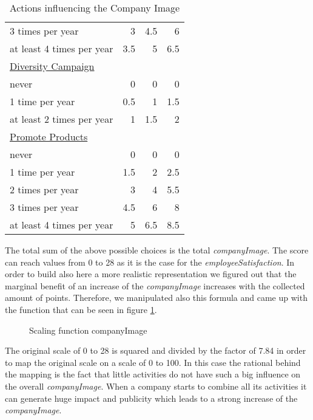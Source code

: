 \begin{table}[]
\begin{tabular}{|l|r|r|r|}
3 times per year                  & 3    & 4.5    & 6 \\
at least 4 times per year         & 3.5  & 5      & 6.5  \\
\underline{Diversity Campaign}    & & & \\
never                             & 0    & 0      & 0 \\
1 time per year                   & 0.5  & 1      & 1.5  \\
at least 2 times per year         & 1    & 1.5    & 2 \\
\underline{Promote Products} & & & \\
never                             & 0    & 0      & 0 \\
1 time per year                   & 1.5  & 2      & 2.5  \\
2 times per year                  & 3    & 4      & 5.5  \\
3 times per year                  & 4.5  & 6      & 8 \\
at least 4 times per year         & 5    & 6.5    & 8.5  \\
\hline
\end{tabular}
\caption{Actions influencing the Company Image}
\label{calculation_CI}
\end{table}

The total sum of the above possible choices is the total \textit{companyImage}. The score can reach values from 0 to 28 as it is the case for the \textit{employeeSatisfaction}. In order to build also here a more realistic representation we figured out that the marginal benefit of an increase of the \textit{companyImage} increases with the collected amount of points. Therefore, we manipulated also this formula and came up with the function that can be seen in figure \ref{fig:scaling}.

\begin{figure}
    \centering
    \caption{Scaling function companyImage}
    \label{fig:scaling}
\end{figure}

The original scale of 0 to 28 is squared and divided by the factor of 7.84 in order to map the original scale on a scale of 0 to 100. In this case the rational behind the mapping is the fact that little activities do not have such  a big influence on the overall \textit{companyImage}. When a company starts to combine all its activities it can generate huge impact and publicity which leads to a strong increase of the \textit{companyImage}.